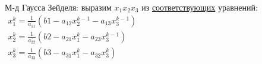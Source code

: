 \documentclass{article}
\begin{document}
М-д Гаусса Зейделя: выразим $x_1 x_2 x_3$ из \underline{соответствующих}
уравнений:\\
\begin{math}
\begin{array}{l}
  x_1^k = \frac{1}{a_{11}} (b1 - a_{12}x_2^{k-1} - a_{13}x_3^{k-1})\\
  x_2^k = \frac{1}{a_{22}} (b2 - a_{21}x_1^{k} - a_{23}x_3^{k-1})\\
  x_3^k = \frac{1}{a_{33}} (b3 - a_{31}x_1^{k} - a_{32}x_3^{k})
\end{array}
\end{math} 
\end{document}
